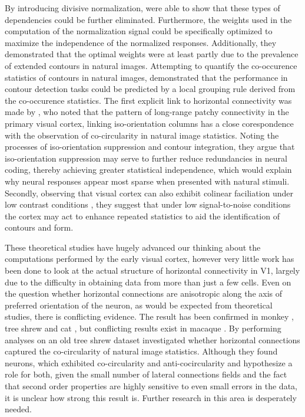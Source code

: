 By introducing divisive normalization, \cite{Schwartz2001a} were able
to show that these types of dependencies could be further
eliminated. Furthermore, the weights used in the computation of the
normalization signal could be specifically optimized to maximize the
independence of the normalized responses. Additionally, they
demonstrated that the optimal weights were at least partly due to the
prevalence of extended contours in natural images. Attempting to
quantify the co-occurence statistics of contours in natural images,
\cite{Geisler2001} demonstrated that the performance in contour
detection tasks could be predicted by a local grouping rule derived
from the co-occurence statistics. The first explicit link to
horizontal connectivity was made by \cite{Sigman2001}, who noted that
the pattern of long-range patchy connectivity in the primary visual
cortex, linking iso-orientation columns has a close corespondence with
the observation of co-circularity in natural image statistics. Noting
the processes of iso-orientation suppression and contour integration,
they argue that iso-orientation suppression may serve to further
reduce redundancies in neural coding, thereby achieving greater
statistical independence, which would explain why neural responses
appear most sparse when presented with natural stimuli. Secondly,
observing that visual cortex can also exhibit colinear faciliation
under low contrast conditions \citep{Sceniak1999, Kapadia1999}, they
suggest that under low signal-to-noise conditions the cortex may act
to enhance repeated statistics to aid the identification of contours
and form.

These theoretical studies have hugely advanced our thinking about the
computations performed by the early visual cortex, however very little
work has been done to look at the actual structure of horizontal
connectivity in V1, largely due to the difficulty in obtaining data
from more than just a few cells. Even on the question whether
horizontal connections are anisotropic along the axis of preferred
orientation of the neuron, as would be expected from theoretical
studies, there is conflicting evidence. The result has been confirmed
in monkey \citep{Sincich2001}, tree shrew \citep{Bosking1997} and cat
\citep{Schmidt1997}, but conflicting results exist in macaque
\cite{Angelucci2002}. By performing analyses on an old tree shrew
dataset \cite{Hunt2011} investigated whether horizontal connections
captured the co-circularity of natural image statistics. Although they
found neurons, which exhibited co-circularity and anti-cocircularity
and hypothesize a role for both, given the small number of lateral
connections fields and the fact that second order properties are
highly sensitive to even small errors in the data, it is unclear how
strong this result is. Further research in this area is desperately
needed.
